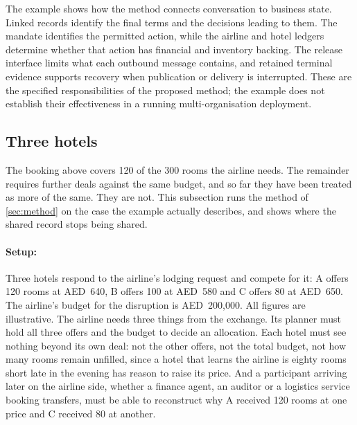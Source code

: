 The example shows how the method connects conversation to business state. Linked records identify the final terms and the decisions leading to them. The mandate identifies the permitted action, while the airline and hotel ledgers determine whether that action has financial and inventory backing. The release interface limits what each outbound message contains, and retained terminal evidence supports recovery when publication or delivery is interrupted. These are the specified responsibilities of the proposed method; the example does not establish their effectiveness in a running multi-organisation deployment.

\subsection{Three hotels}
\label{sec:example-multi}

The booking above covers 120 of the 300 rooms the airline needs. The remainder requires further deals against the same budget, and so far they have been treated as more of the same. They are not. This subsection runs the method of \cref{sec:method} on the case the example actually describes, and shows where the shared record stops being shared.

\paragraph{Setup:} Three hotels respond to the airline's lodging request and compete for it: A offers 120 rooms at AED~640, B offers 100 at AED~580 and C offers 80 at AED~650. The airline's budget for the disruption is AED~200,000. All figures are illustrative. The airline needs three things from the exchange. Its planner must hold all three offers and the budget to decide an allocation. Each hotel must see nothing beyond its own deal: not the other offers, not the total budget, not how many rooms remain unfilled, since a hotel that learns the airline is eighty rooms short late in the evening has reason to raise its price. And a participant arriving later on the airline side, whether a finance agent, an auditor or a logistics service booking transfers, must be able to reconstruct why A received 120 rooms at one price and C received 80 at another.

